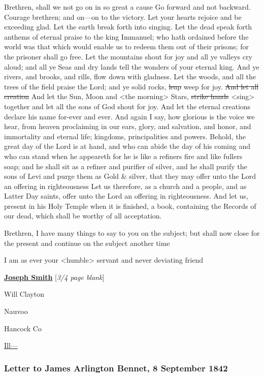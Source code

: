 				Brethren, shall we not go on in so great a cause Go forward and not backward. Courage brethren; and on---on to the victory. Let your hearts rejoice and be exceeding glad. Let the earth break forth into singing. Let the dead speak forth anthems of eternal praise to the king Immanuel; who hath ordained before the world was that which would enable us to redeem them out of their prisons; for the prisoner shall go free. Let the mountains shout for joy and all ye valleys cry aloud; and all ye Seas and dry lands tell the wonders of your eternal king. And ye rivers, and brooks, and rills, flow down with gladness. Let the woods, and all the trees of the field praise the Lord; and ye solid rocks, \sout{leap} weep for joy. \sout{And let all creation} And let the Sun, Moon and <the morning> Stars, \sout{strike hands} <sing> together and let all the sons of God shout for joy. And let the eternal creations declare his name for-ever and ever. And again I say, how glorious is the voice we hear, from heaven proclaiming in our ears, glory, and salvation, and honor, and immortality and eternal life; kingdoms, principalities and powers. Behold, the great day of the Lord is at hand, and who can abide the day of his coming and who can stand when he appeareth for he is like a refiners fire and like fullers soap; and he shall sit as a refiner and purifier of silver, and he shall purify the sons of Levi and purge them as Gold \& silver, that they may offer unto the Lord an offering in righteousness Let us therefore, as a church and a people, and as Latter Day saints, offer unto the Lord an offering in righteousness. And let us, present in his Holy Temple when it is finished, a book, containing the Records of our dead, which shall be worthy of all acceptation.

				Brethren, I have many things to say to you on the subject; but shall now close for the present and continue on the subject another time

				I am as ever your <humble> servant and never deviating friend

				\begin{tightright}
					\uline{\textbf{Joseph Smith}} [\textit{3/4 page blank}]
				\end{tightright}

				Will Clayton

				Nauvoo

				Hancock Co

				\uline{Ill---}
				
		\subsubsection{Letter to James Arlington Bennet, 8 September 1842}
			\label{EMS-1842-JS-8-SEP-1842}
		
